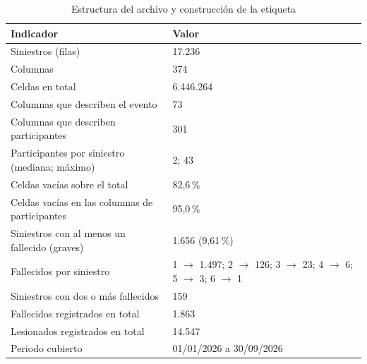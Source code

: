 \begin{table}[htbp]
\centering
\small
\caption{Estructura del archivo y construcción de la etiqueta}
\label{tab:a1}
\begin{tabular}{p{8.2cm}p{6.8cm}}
\toprule
Indicador & Valor \\
\midrule
Siniestros (filas) & 17.236 \\
Columnas & 374 \\
Celdas en total & 6.446.264 \\
Columnas que describen el evento & 73 \\
Columnas que describen participantes & 301 \\
Participantes por siniestro (mediana; máximo) & 2; 43 \\
Celdas vacías sobre el total & 82,6\,\% \\
Celdas vacías en las columnas de participantes & 95,0\,\% \\
\addlinespace
Siniestros con al menos un fallecido (graves) & 1.656 (9,61\,\%) \\
Fallecidos por siniestro & 1 $\rightarrow$ 1.497; 2 $\rightarrow$ 126; 3 $\rightarrow$ 23; 4 $\rightarrow$ 6; 5 $\rightarrow$ 3; 6 $\rightarrow$ 1 \\
Siniestros con dos o más fallecidos & 159 \\
Fallecidos registrados en total & 1.863 \\
Lesionados registrados en total & 14.547 \\
Periodo cubierto & 01/01/2026 a 30/09/2026 \\
\bottomrule
\end{tabular}
\par\vspace{2pt}{\footnotesize Fuente: archivo de la ANT [2], hoja BDD\_2026. Cálculo propio (Anexo B).}
\end{table}
